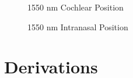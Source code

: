 \documentclass[journal,twoside,web]{ieeecolor}
\begin{document}
\begin{figure}[htb!]
    \caption{\label{fig:1550-Cochlear} 1550 nm Cochlear Position}
\end{figure}

\begin{figure}[htb!]
    \caption{\label{fig:1550-Intra} 1550 nm Intranasal Position}
\end{figure}
\section{Derivations}
\end{document}
